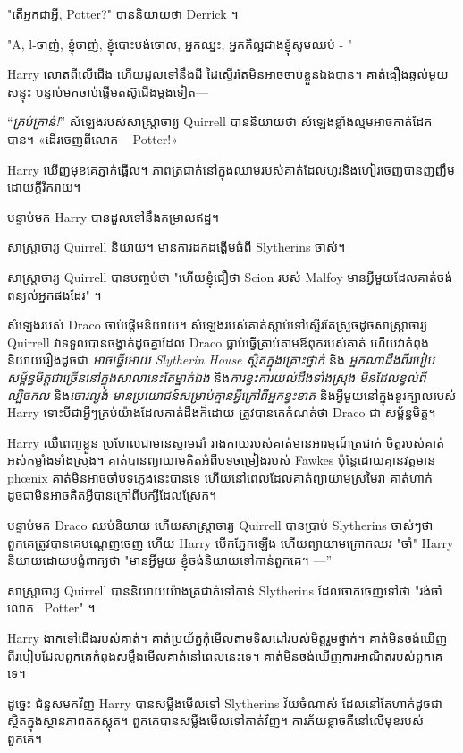 {{{{{"តើអ្នកជាអ្វី, Potter?" បាននិយាយថា Derrick ។

"A, l-ចាញ់, ខ្ញុំចាញ់, ខ្ញុំបោះបង់ចោល, អ្នកឈ្នះ, អ្នកគឺល្អជាងខ្ញុំសូមឈប់ - "

Harry លោតពីលើជើង ហើយដួលទៅនឹងដី ដៃស្ទើរតែមិនអាចចាប់ខ្លួនឯងបាន។ គាត់​ងឿង​ឆ្ងល់​មួយ​សន្ទុះ បន្ទាប់​មក​ចាប់​ផ្តើម​តស៊ូ​ជើង​ម្តង​ទៀត—

“\emph{គ្រប់គ្រាន់!}” សំឡេងរបស់សាស្រ្តាចារ្យ Quirrell បាននិយាយថា សំឡេងខ្លាំងល្មមអាចកាត់ដែកបាន។ «ដើរចេញពីលោក ~ Potter!»

Harry ឃើញមុខគេភ្ញាក់ផ្អើល។ ភាពត្រជាក់នៅក្នុងឈាមរបស់គាត់ដែលហូរនិងហៀរចេញបានញញឹមដោយក្តីរីករាយ។

បន្ទាប់មក Harry បានដួលទៅនឹងកម្រាលឥដ្ឋ។

សាស្រ្តាចារ្យ Quirrell និយាយ។ មានការដកដង្ហើមធំពី Slytherins ចាស់។

សាស្ត្រាចារ្យ Quirrell បានបញ្ចប់ថា "ហើយខ្ញុំជឿថា Scion របស់ Malfoy មានអ្វីមួយដែលគាត់ចង់ពន្យល់អ្នកផងដែរ" ។

សំឡេងរបស់ Draco ចាប់ផ្តើមនិយាយ។ សំឡេងរបស់គាត់ស្តាប់ទៅស្ទើរតែស្រួចដូចសាស្រ្តាចារ្យ Quirrell វាទទួលបានចង្វាក់ដូចគ្នាដែល Draco ធ្លាប់ធ្វើត្រាប់តាមឪពុករបស់គាត់ ហើយវាកំពុងនិយាយរឿងដូចជា \emph{អាចធ្វើអោយ Slytherin House ស្ថិតក្នុងគ្រោះថ្នាក់} និង \emph{អ្នកណាដឹងពីរបៀប សម្ព័ន្ធមិត្តជាច្រើននៅក្នុងសាលានេះតែម្នាក់ឯង} និង\emph{ការខ្វះការយល់ដឹងទាំងស្រុង មិនដែលខ្វល់ពីល្បិចកល} និង\emph{ចោរល្ងង់ មានប្រយោជន៍សម្រាប់គ្មានអ្វីក្រៅពីអ្នកខ្វះខាត} និងអ្វីមួយនៅក្នុងខួរក្បាលរបស់ Harry ទោះបីជាអ្វីៗគ្រប់យ៉ាងដែលគាត់ដឹងក៏ដោយ ត្រូវបានគេកំណត់ថា Draco ជា សម្ព័ន្ធមិត្ត។

Harry ឈឺពេញខ្លួន ប្រហែលជាមានស្នាមជាំ រាងកាយរបស់គាត់មានអារម្មណ៍ត្រជាក់ ចិត្តរបស់គាត់អស់កម្លាំងទាំងស្រុង។ គាត់បានព្យាយាមគិតអំពីបទចម្រៀងរបស់ Fawkes ប៉ុន្តែដោយគ្មានវត្តមាន phœnix គាត់មិនអាចចាំបទភ្លេងនេះបានទេ ហើយនៅពេលដែលគាត់ព្យាយាមស្រមៃវា គាត់ហាក់ដូចជាមិនអាចគិតអ្វីបានក្រៅពីបក្សីដែលស្រែក។

បន្ទាប់មក Draco ឈប់និយាយ ហើយសាស្រ្តាចារ្យ Quirrell បានប្រាប់ Slytherins ចាស់ៗថា ពួកគេត្រូវបានគេបណ្តេញចេញ ហើយ Harry បើកភ្នែកឡើង ហើយព្យាយាមក្រោកឈរ "ចាំ" Harry និយាយដោយបង្ខំពាក្យថា "មានអ្វីមួយ ខ្ញុំចង់និយាយទៅកាន់ពួកគេ។ —”

សាស្រ្តាចារ្យ Quirrell បាននិយាយយ៉ាងត្រជាក់ទៅកាន់ Slytherins ដែលចាកចេញទៅថា "រង់ចាំលោក~ Potter" ។

Harry ងាកទៅជើងរបស់គាត់។ គាត់​ប្រយ័ត្ន​កុំ​មើល​តាម​ទិសដៅ​របស់​មិត្ត​រួម​ថ្នាក់។ គាត់មិនចង់ឃើញពីរបៀបដែលពួកគេកំពុងសម្លឹងមើលគាត់នៅពេលនេះទេ។ គាត់មិនចង់ឃើញការអាណិតរបស់ពួកគេទេ។

ដូច្នេះ ជំនួសមកវិញ Harry បានសម្លឹងមើលទៅ Slytherins វ័យចំណាស់ ដែលនៅតែហាក់ដូចជាស្ថិតក្នុងស្ថានភាពតក់ស្លុត។ ពួកគេបានសម្លឹងមើលទៅគាត់វិញ។ ការភ័យខ្លាចគឺនៅលើមុខរបស់ពួកគេ។

}}}}}

